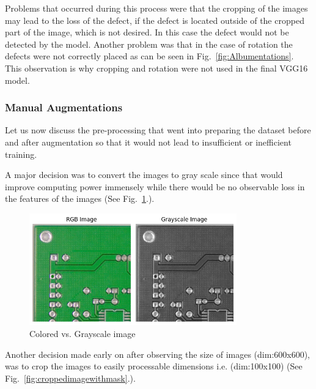 \documentclass[12pt]{article}
\begin{document}
Problems that occurred during this process were that the cropping of the images may lead to the loss of the defect, if the defect is located outside of the cropped part of the image, which is not desired.
In this case the defect would not be detected by the model. Another problem was that in the case of rotation the defects were not correctly placed as can be seen in Fig.~\ref{fig:Albumentations}. This observation is why cropping and rotation were not used in the final VGG16 model.

\subsubsection{Manual Augmentations}
Let us now discuss the pre-processing that went into preparing the dataset before and after augmentation so that it would not lead to insufficient or inefficient training.

A major decision was to convert the images to gray scale since that would improve computing power immensely while there would be no observable loss in the features of the images \cite{Saponara2022} (See Fig.~\ref{fig:Rgb_gray}.).
\begin{figure}[h]
    \centering
    \includegraphics[width=0.8\textwidth]{./graphics/rgb vs grayscale.png}
    \caption{Colored vs. Grayscale image}
    \label{fig:Rgb_gray}
\end{figure}

Another decision made early on after observing the size of images (dim:600x600), was to crop the images to easily processable dimensions i.e. (dim:100x100) \cite{Saponara2022} (See Fig.~\ref{fig:croppedimagewithmask}.). 
\end{document}
